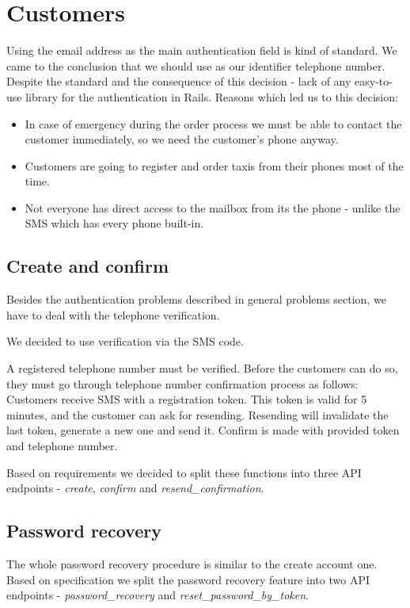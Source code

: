 \section{Customers}
Using the email address as the main authentication field is kind of standard. We came to the conclusion that we should use as our identifier telephone number. Despite the standard and the consequence of this decision - lack of any easy-to-use library for the authentication in Rails. Reasons which led us to this decision:
\begin{itemize}
	\item In case of emergency during the order process we must be able to contact the customer immediately, so we need the customer's phone anyway.
	\item Customers are going to register and order taxis from their phones most of the time. 
	\item Not everyone has direct access to the mailbox from its the phone - unlike the SMS which has every phone built-in. 
\end{itemize}
\subsection{Create and confirm}
Besides the authentication problems described in general problems section, we have to deal with the telephone verification.

We decided to use verification via the SMS code.

A registered telephone number must be verified.  Before the customers can do so, they must go through telephone number confirmation process as follows: Customers receive SMS with a registration token. This token is valid for 5 minutes, and the customer can ask for resending.  Resending will invalidate the last token, generate a new one and send it. Confirm is made with provided token and telephone number.

Based on requirements we decided to split these functions into three API endpoints - \textit{create}, \textit{confirm} and \textit{resend\_confirmation}.
 
 \subsection{Password recovery}
 The whole password recovery procedure is similar to the create account one.
 Based on specification we split the password recovery feature into two API endpoints - \textit{password\_recovery} and \textit{reset\_password\_by\_token}. 
 
